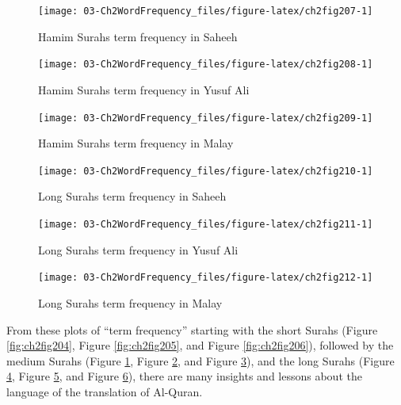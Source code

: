 \documentclass[
]{article}
\begin{document}
\begin{figure}

{\centering \texttt{[image: 03-Ch2WordFrequency\_files/figure-latex/ch2fig207-1]} 

}

\caption{Hamim Surahs term frequency in Saheeh}\label{fig:ch2fig207}
\end{figure}

\begin{figure}

{\centering \texttt{[image: 03-Ch2WordFrequency\_files/figure-latex/ch2fig208-1]} 

}

\caption{Hamim Surahs term frequency in Yusuf Ali}\label{fig:ch2fig208}
\end{figure}

\begin{figure}

{\centering \texttt{[image: 03-Ch2WordFrequency\_files/figure-latex/ch2fig209-1]} 

}

\caption{Hamim Surahs term frequency in Malay}\label{fig:ch2fig209}
\end{figure}

\begin{figure}

{\centering \texttt{[image: 03-Ch2WordFrequency\_files/figure-latex/ch2fig210-1]} 

}

\caption{Long Surahs term frequency in Saheeh}\label{fig:ch2fig210}
\end{figure}

\begin{figure}

{\centering \texttt{[image: 03-Ch2WordFrequency\_files/figure-latex/ch2fig211-1]} 

}

\caption{Long Surahs term frequency in Yusuf Ali}\label{fig:ch2fig211}
\end{figure}

\begin{figure}

{\centering \texttt{[image: 03-Ch2WordFrequency\_files/figure-latex/ch2fig212-1]} 

}

\caption{Long Surahs term frequency in Malay}\label{fig:ch2fig212}
\end{figure}

From these plots of ``term frequency'' starting with the short Surahs (Figure \ref{fig:ch2fig204}, Figure \ref{fig:ch2fig205}, and Figure \ref{fig:ch2fig206}), followed by the medium Surahs (Figure \ref{fig:ch2fig207}, Figure \ref{fig:ch2fig208}, and Figure \ref{fig:ch2fig209}), and the long Surahs (Figure \ref{fig:ch2fig210}, Figure \ref{fig:ch2fig211}, and Figure \ref{fig:ch2fig212}), there are many insights and lessons about the language of the translation of Al-Quran.
\end{document}
